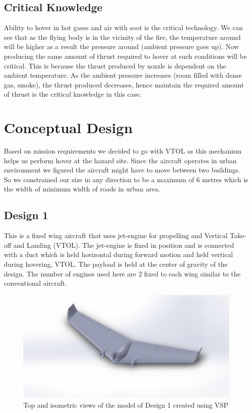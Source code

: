\section{Critical Knowledge}
Ability to hover in hot gases and air with soot is the critical technology. We can see that as the flying body is in the vicinity of the fire, the temperature around will be higher as a result the pressure around (ambient pressure goes up). Now producing the same amount of thrust required to hover at such conditions will be critical. This is because the thrust produced by nozzle is dependent on the ambient temperature. As the ambient pressure increases (room filled with dense gas, smoke), the thrust produced decreases, hence maintain the required amount of thrust is the critical knowledge in this case.
\chapter{Conceptual Design}
Based on mission requirements we decided to go with VTOL as this mechanism helps us perform hover at the hazard site. Since the aircraft operates in urban environment we figured the aircraft might have to move between two buildings. So we constrained our size in any direction to be a maximum of 6 metres which is the width of minimum width of roads in urban area.
\section{Design 1}
This is a fixed wing aircraft that uses jet-engine for propelling and Vertical Take-off and Landing (VTOL). The jet-engine is fixed in position and is connected with a duct which is held horizontal during forward motion and held vertical during hovering, VTOL. The payload is held at the center of gravity of the design. The number of engines used here are 2 fixed to each wing similar to the conventional aircraft.
\begin{figure}[H]
\centering
\includegraphics[scale = 0.15]{iter1.png}
\caption{Top and isometric views of the model of Design 1 created using VSP}
\label{Fig3.1}
\end{figure}

